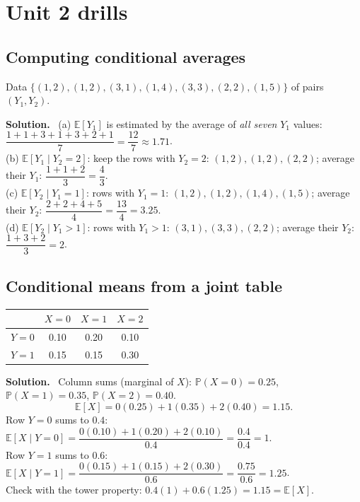 \documentclass[11pt]{article}
\newcommand{\E}{\mathbb{E}}
\renewcommand{\P}{\mathbb{P}}
\newenvironment{soln}{\par\smallskip\noindent\textbf{Solution.}\ }{\par\medskip}
\begin{document}
\section{Unit 2 drills}

\subsection*{Computing conditional averages}
Data $\{(1,2),(1,2),(3,1),(1,4),(3,3),(2,2),(1,5)\}$ of pairs $(Y_1,Y_2)$.
\begin{soln}
(a) $\E[Y_1]$ is estimated by the average of \emph{all seven} $Y_1$ values: $\dfrac{1+1+3+1+3+2+1}7=\dfrac{12}7\approx1.71$.\\
(b) $\E[Y_1\mid Y_2{=}2]$: keep the rows with $Y_2=2$: $(1,2),(1,2),(2,2)$; average their $Y_1$: $\dfrac{1+1+2}3=\dfrac43$.\\
(c) $\E[Y_2\mid Y_1{=}1]$: rows with $Y_1=1$: $(1,2),(1,2),(1,4),(1,5)$; average their $Y_2$: $\dfrac{2+2+4+5}4=\dfrac{13}4=3.25$.\\
(d) $\E[Y_2\mid Y_1>1]$: rows with $Y_1>1$: $(3,1),(3,3),(2,2)$; average their $Y_2$: $\dfrac{1+3+2}3=2$.
\end{soln}

\subsection*{Conditional means from a joint table}
\begin{center}
\begin{tabular}{c|ccc}
 & $X=0$ & $X=1$ & $X=2$\\\hline
$Y=0$ & 0.10 & 0.20 & 0.10\\
$Y=1$ & 0.15 & 0.15 & 0.30
\end{tabular}
\end{center}
\begin{soln}
Column sums (marginal of $X$): $\P(X{=}0)=0.25$, $\P(X{=}1)=0.35$, $\P(X{=}2)=0.40$.
\[
\E[X]=0(0.25)+1(0.35)+2(0.40)=1.15.
\]
Row $Y=0$ sums to $0.4$: $\E[X\mid Y{=}0]=\dfrac{0(0.10)+1(0.20)+2(0.10)}{0.4}=\dfrac{0.4}{0.4}=1$.\\
Row $Y=1$ sums to $0.6$: $\E[X\mid Y{=}1]=\dfrac{0(0.15)+1(0.15)+2(0.30)}{0.6}=\dfrac{0.75}{0.6}=1.25$.\\
Check with the tower property: $0.4(1)+0.6(1.25)=1.15=\E[X]$. \checkmark
\end{soln}
\end{document}
